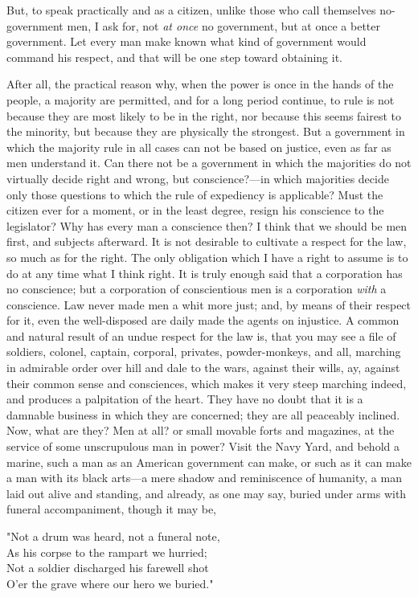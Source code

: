 \documentclass[12pt]{article}
\begin{document}
But, to speak practically and as a citizen, unlike those who call
themselves no-government men, I ask for, not \emph{at once} no
government, but at once a better government. Let every man make known
what kind of government would command his respect, and that will be one
step toward obtaining it.

After all, the practical reason why, when the power is once in the hands
of the people, a majority are permitted, and for a long period continue,
to rule is not because they are most likely to be in the right, nor
because this seems fairest to the minority, but because they are
physically the strongest. But a government in which the majority rule in
all cases can not be based on justice, even as far as men understand it.
Can there not be a government in which the majorities do not virtually
decide right and wrong, but conscience?---in which majorities decide
only those questions to which the rule of expediency is applicable? Must
the citizen ever for a moment, or in the least degree, resign his
conscience to the legislator? Why has every man a conscience then? I
think that we should be men first, and subjects afterward. It is not
desirable to cultivate a respect for the law, so much as for the right.
The only obligation which I have a right to assume is to do at any time
what I think right. It is truly enough said that a corporation has no
conscience; but a corporation of conscientious men is a corporation
\emph{with} a conscience. Law never made men a whit more just; and, by
means of their respect for it, even the well-disposed are daily made the
agents on injustice. A common and natural result of an undue respect for
the law is, that you may see a file of soldiers, colonel, captain,
corporal, privates, powder-monkeys, and all, marching in admirable order
over hill and dale to the wars, against their wills, ay, against their
common sense and consciences, which makes it very steep marching indeed,
and produces a palpitation of the heart. They have no doubt that it is a
damnable business in which they are concerned; they are all peaceably
inclined. Now, what are they? Men at all? or small movable forts and
magazines, at the service of some unscrupulous man in power? Visit the
Navy Yard, and behold a marine, such a man as an American government can
make, or such as it can make a man with its black arts---a mere shadow
and reminiscence of humanity, a man laid out alive and standing, and
already, as one may say, buried under arms with funeral accompaniment,
though it may be,
\begin{displayquote}
"Not a drum was heard, not a funeral note,\\
\hspace{+1em}		As his corpse to the rampart we hurried;\\
Not a soldier discharged his farewell shot\\
\hspace{+1em}		O'er the grave where our hero we buried."
\end{displayquote}
\end{document}
